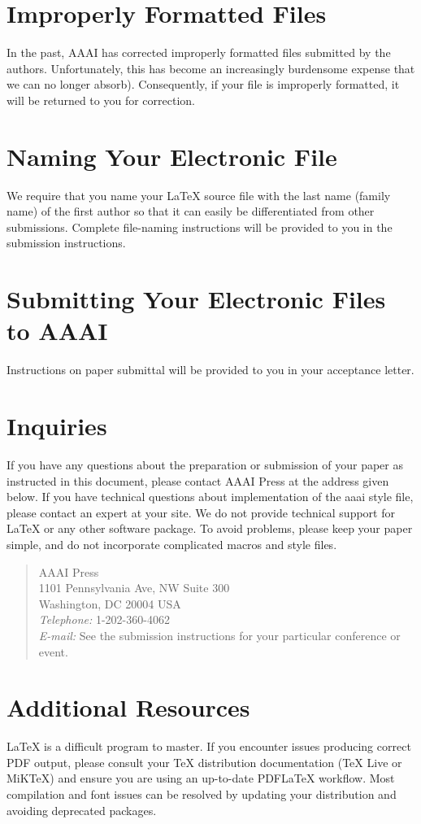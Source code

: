 \section{Improperly Formatted Files }
In the past, AAAI has corrected improperly formatted files submitted by the authors. Unfortunately, this has become an increasingly burdensome expense that we can no longer absorb). Consequently, if your file is improperly formatted, it will be returned to you for correction.

\section{Naming Your Electronic File}
We require that you name your \LaTeX{} source file with the last name (family name) of the first author so that it can easily be differentiated from other submissions. Complete file-naming instructions will be provided to you in the submission instructions.

\section{Submitting Your Electronic Files to AAAI}
Instructions on paper submittal will be provided to you in your acceptance letter.

\section{Inquiries}
If you have any questions about the preparation or submission of your paper as instructed in this document, please contact AAAI Press at the address given below. If you have technical questions about implementation of the aaai style file, please contact an expert at your site. We do not provide technical support for \LaTeX{} or any other software package. To avoid problems, please keep your paper simple, and do not incorporate complicated macros and style files.

\begin{quote}
\noindent AAAI Press\\
1101 Pennsylvania Ave, NW Suite 300\\
Washington, DC 20004 USA\\
\textit{Telephone:} 1-202-360-4062\\
\textit{E-mail:} See the submission instructions for your particular conference or event.
\end{quote}

\section{Additional Resources}
\LaTeX{} is a difficult program to master. If you encounter issues producing correct PDF output, please consult your TeX distribution documentation (TeX Live or MiKTeX) and ensure you are using an up-to-date PDF\LaTeX{} workflow. Most compilation and font issues can be resolved by updating your distribution and avoiding deprecated packages.

